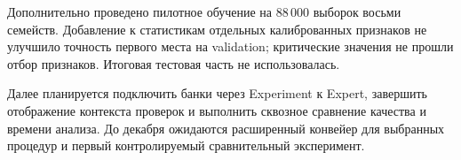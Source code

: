 
Дополнительно проведено пилотное обучение на 88\,000 выборок восьми
семейств. Добавление к статистикам отдельных калиброванных признаков
не улучшило точность первого места на validation; критические значения
не прошли отбор признаков. Итоговая тестовая часть не использовалась.

Далее планируется подключить банки через Experiment к Expert, завершить
отображение контекста проверок и выполнить сквозное сравнение качества
и времени анализа. До декабря ожидаются расширенный конвейер для
выбранных процедур и первый контролируемый сравнительный эксперимент.
